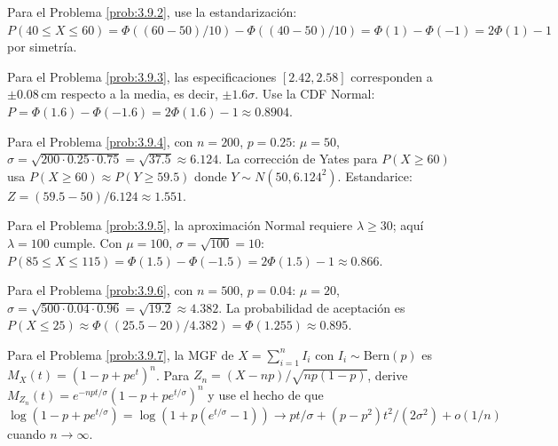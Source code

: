 \begin{sugerencia}
	\label{sug:3.9.2}
	Para el Problema \ref{prob:3.9.2}, use la estandarización: $P(40 \le X \le 60) = \Phi((60-50)/10) - \Phi((40-50)/10) = \Phi(1) - \Phi(-1) = 2\Phi(1) - 1$ por simetría.
\end{sugerencia}

\begin{sugerencia}
	\label{sug:3.9.3}
	Para el Problema \ref{prob:3.9.3}, las especificaciones $[2.42, 2.58]$ corresponden a $\pm 0.08\,\text{cm}$ respecto a la media, es decir, $\pm 1.6\sigma$. Use la CDF Normal: $P = \Phi(1.6) - \Phi(-1.6) = 2\Phi(1.6) - 1 \approx 0.8904$.
\end{sugerencia}

\begin{sugerencia}
	\label{sug:3.9.4}
	Para el Problema \ref{prob:3.9.4}, con $n = 200$, $p = 0.25$: $\mu = 50$, $\sigma = \sqrt{200 \cdot 0.25 \cdot 0.75} = \sqrt{37.5} \approx 6.124$. La corrección de Yates para $P(X \ge 60)$ usa $P(X \ge 60) \approx P(Y \ge 59.5)$ donde $Y \sim N(50, 6.124^{2})$. Estandarice: $Z = (59.5 - 50)/6.124 \approx 1.551$.
\end{sugerencia}

\begin{sugerencia}
	\label{sug:3.9.5}
	Para el Problema \ref{prob:3.9.5}, la aproximación Normal requiere $\lambda \ge 30$; aquí $\lambda = 100$ cumple. Con $\mu = 100$, $\sigma = \sqrt{100} = 10$: $P(85 \le X \le 115) = \Phi(1.5) - \Phi(-1.5) = 2\Phi(1.5) - 1 \approx 0.866$.
\end{sugerencia}

\begin{sugerencia}
	\label{sug:3.9.6}
	Para el Problema \ref{prob:3.9.6}, con $n = 500$, $p = 0.04$: $\mu = 20$, $\sigma = \sqrt{500 \cdot 0.04 \cdot 0.96} = \sqrt{19.2} \approx 4.382$. La probabilidad de aceptación es $P(X \le 25) \approx \Phi((25.5 - 20)/4.382) = \Phi(1.255) \approx 0.895$.
\end{sugerencia}

\begin{sugerencia}
	\label{sug:3.9.7}
	Para el Problema \ref{prob:3.9.7}, la MGF de $X = \sum_{i=1}^{n} I_{i}$ con $I_{i} \sim \text{Bern}(p)$ es $M_{X}(t) = (1 - p + p e^{t})^{n}$. Para $Z_{n} = (X - np)/\sqrt{np(1-p)}$, derive $M_{Z_{n}}(t) = e^{-npt/\sigma} (1 - p + p e^{t/\sigma})^{n}$ y use el hecho de que $\log(1 - p + p e^{t/\sigma}) = \log(1 + p(e^{t/\sigma} - 1)) \to pt/\sigma + (p - p^{2})t^{2}/(2\sigma^{2}) + o(1/n)$ cuando $n \to \infty$.
\end{sugerencia}

